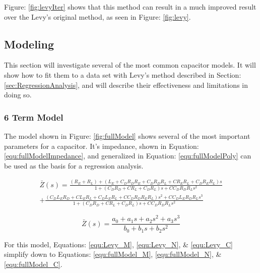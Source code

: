 


Figure: \ref{fig:levyIter} shows that this method can result in a much improved result over the Levy's original method, as seen in Figure: \ref{fig:levy}.



\subsection{Modeling}
This section will investigate several of the most common capacitor models. It will show how to fit them to a data set with Levy's method described in Section: \ref{sec:RegressionAnalysis}, and will describe their effectiveness and limitations in doing so.

\subsubsection{6 Term Model}


The model shown in Figure: \ref{fig:fullModel} shows several of the most important parameters for a capacitor. It's impedance, shown in Equation: \eqref{equ:fullModelImpedance}, and generalized in Equation: \eqref{equ:fullModelPoly} can be used as the basis for a regression analysis.

\begin{equation}
    \begin{split}
        \label{equ:fullModelImpedance}
        \bar{Z}(s) = \frac{(R_E + R_L) + (L_E + C_DR_DR_E + C_DR_DR_L + CR_ER_L + C_DR_ER_L)s}{1 + (C_DR_D + CR_L + C_DR_L)s + CC_DR_DR_Ls^2} \\ 
        + \frac{(C_DL_ER_D + CL_ER_L + C_DL_ER_L + CC_DR_DR_ER_L)s^2 + CC_DL_ER_DR_Ls^3}{1 + (C_DR_D + CR_L + C_DR_L)s + CC_DR_DR_Ls^2}
    \end{split}
\end{equation}

\begin{equation}
    \label{equ:fullModelPoly}
    \bar{Z}(s) = \frac{a_0 + a_1s + a_2s^2 + a_3s^3}{b_0 + b_1s + b_2s^2}
\end{equation}


For this model, Equations: \eqref{equ:Levy_M}, \eqref{equ:Levy_N}, \& \eqref{equ:Levy_C} simplify down to Equations: \eqref{equ:fullModel_M}, \eqref{equ:fullModel_N}, \& \eqref{equ:fullModel_C}.


